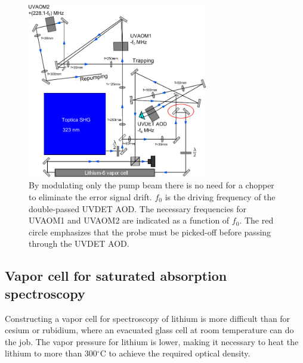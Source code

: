\documentclass[oneside,12pt]{memoir}
\begin{document}
\begin{figure} \centering
\includegraphics[width=0.7\textwidth]{../figures/323setup/aomsetup/improved_setup.pdf}
\caption[Improved AOM setup]{\small  By modulating only the pump beam there is
no need for a chopper to eliminate the error signal drift.  $f_{0}$ is the
driving frequency of the double-passed UVDET AOD.  The necessary frequencies
for UVAOM1 and UVAOM2 are indicated as a function of $f_{0}$. The red circle
emphasizes that the probe must be picked-off before passing through the UVDET
AOD.   } \label{fig:improved} \end{figure}

\subsection{Vapor cell for saturated absorption spectroscopy}

Constructing a vapor cell for spectroscopy of lithium is more difficult than
for cesium or rubidium, where an evacuated glass cell at room temperature can
do the job.   The vapor pressure for lithium is lower, making it necessary to
heat the lithium to more than 300$^{\circ}$C to achieve the required optical
density.  
\end{document}
